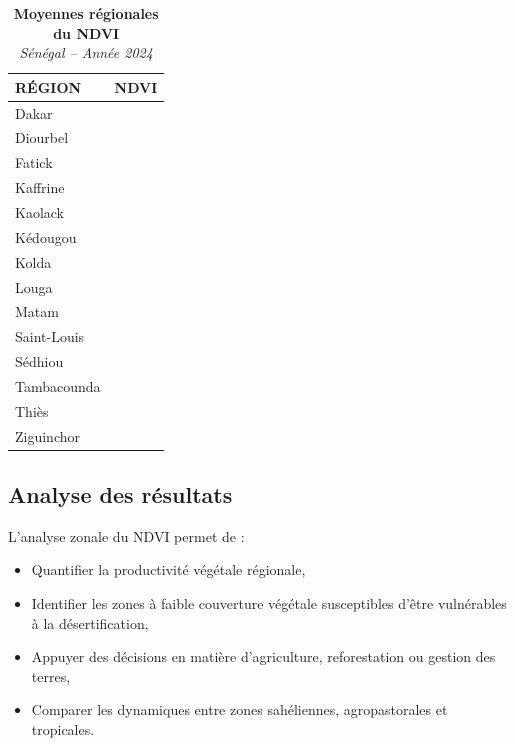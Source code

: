 \documentclass[
]{book}
\begin{document}
\begin{table}[!t]
\caption*{
{\large \textbf{Moyennes régionales du NDVI}} \\ 
{\small \emph{Sénégal -- Année 2024}}
} 
\fontsize{12.0pt}{14.4pt}\selectfont
\begin{tabular*}{\linewidth}{@{\extracolsep{\fill}}lr}
\toprule
{RÉGION} & {NDVI} \\ 
\midrule\addlinespace[2.5pt]
Dakar & {\cellcolor[HTML]{FBFED0}{\textcolor[HTML]{000000}{0.25}}} \\ 
Diourbel & {\cellcolor[HTML]{D4EEA0}{\textcolor[HTML]{000000}{0.31}}} \\ 
Fatick & {\cellcolor[HTML]{ADDD8E}{\textcolor[HTML]{000000}{0.34}}} \\ 
Kaffrine & {\cellcolor[HTML]{A4D98A}{\textcolor[HTML]{000000}{0.35}}} \\ 
Kaolack & {\cellcolor[HTML]{ADDD8E}{\textcolor[HTML]{000000}{0.34}}} \\ 
Kédougou & {\cellcolor[HTML]{0A6F3A}{\textcolor[HTML]{FFFFFF}{0.47}}} \\ 
Kolda & {\cellcolor[HTML]{006234}{\textcolor[HTML]{FFFFFF}{0.49}}} \\ 
Louga & {\cellcolor[HTML]{ECF8B1}{\textcolor[HTML]{000000}{0.28}}} \\ 
Matam & {\cellcolor[HTML]{D3EDA0}{\textcolor[HTML]{000000}{0.31}}} \\ 
Saint-Louis & {\cellcolor[HTML]{FFFFE5}{\textcolor[HTML]{000000}{0.24}}} \\ 
Sédhiou & {\cellcolor[HTML]{004529}{\textcolor[HTML]{FFFFFF}{0.52}}} \\ 
Tambacounda & {\cellcolor[HTML]{39A156}{\textcolor[HTML]{FFFFFF}{0.42}}} \\ 
Thiès & {\cellcolor[HTML]{D1ED9F}{\textcolor[HTML]{000000}{0.31}}} \\ 
Ziguinchor & {\cellcolor[HTML]{006234}{\textcolor[HTML]{FFFFFF}{0.49}}} \\ 
\bottomrule
\end{tabular*}
\end{table}

\subsection{Analyse des résultats}\label{analyse-des-ruxe9sultats}

L'analyse zonale du NDVI permet de :

\begin{itemize}
\item
  Quantifier la productivité végétale régionale,
\item
  Identifier les zones à faible couverture végétale susceptibles d'être vulnérables à la désertification,
\item
  Appuyer des décisions en matière d'agriculture, reforestation ou gestion des terres,
\item
  Comparer les dynamiques entre zones sahéliennes, agropastorales et tropicales.
\end{itemize}
\end{document}
